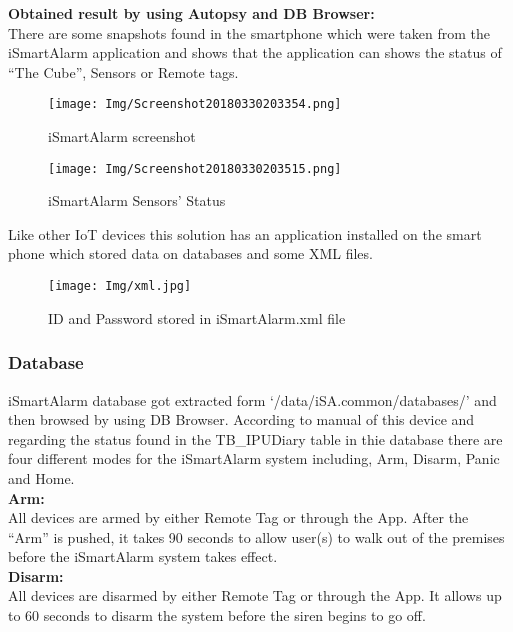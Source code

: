 \documentclass{easychair}
\begin{document}
\newpage
\textbf{Obtained result by using Autopsy and DB Browser:}\\
There are some snapshots found in the smartphone which were taken from the iSmartAlarm application and shows that the application can shows the status of “The Cube”, Sensors or Remote tags.

\begin{figure}[h]
    \centering
    \texttt{[image: Img/Screenshot20180330203354.png]}
    \caption{iSmartAlarm screenshot}
    \label{fig:my_label}
\end{figure}

\begin{figure}[h]
    \centering
    \texttt{[image: Img/Screenshot20180330203515.png]}
    \caption{iSmartAlarm Sensors' Status}
    \label{fig:my_label}
\end{figure}

Like other IoT devices this solution has an application installed on the smart phone which stored data on databases and some XML files.
\begin{figure}[h]
    \centering
    \texttt{[image: Img/xml.jpg]}
    \caption{ID and Password stored in iSmartAlarm.xml file}
    \label{fig:my_label}
\end{figure}

\subsubsection{Database}
iSmartAlarm database got extracted form ‘/data/iSA.common/databases/’ and then browsed by using DB Browser. According to manual of this device and regarding the status found in the TB\_IPUDiary table in thie database there are four different modes for the iSmartAlarm system including, Arm, Disarm, Panic and Home.\\

\textbf{Arm:}\\
All devices are armed by either Remote Tag or through the App. After the “Arm” is pushed, it takes 90 seconds to allow user(s) to walk out of the premises before the iSmartAlarm system takes effect\cite{pari_9}.\\

\textbf{Disarm:}\\
All devices are disarmed by either Remote Tag or through the App. It allows up to 60 seconds to disarm the system before the siren begins to go off\cite{pari_9}.\\
\end{document}
